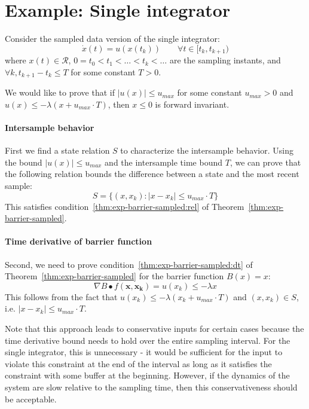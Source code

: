 \documentclass[12pt]{article}
\newcommand{\vecbold}[1]{\boldsymbol{#1}}
\begin{document}
\section{Example: Single integrator}
Consider the sampled data version of the single integrator:
\[\dot{x}(t) = u(x(t_k)) \qquad \forall t \in [t_k, t_{k+1})\]
where $x(t) \in \mathcal{R}$, $0 = t_0 < t_1 < \ldots < t_k < \ldots$ are
the sampling instants, and $\forall k, t_{k+1} - t_k \leq T$ for some
constant $T > 0$.

We would like to prove that if $|u(x)| \leq u_{max}$ for some constant
$u_{max} > 0$ and $u(x) \leq -\lambda(x + u_{max}\cdot T)$, then $x \leq 0$
is forward invariant.

\paragraph{Intersample behavior}
First we find a state relation $S$ to characterize the intersample
behavior. Using the bound $|u(x)| \leq u_{max}$ and the intersample time
bound $T$, we can prove that the following relation bounds the difference
between a state and the most recent sample:
\[S = \{(x,x_k) : |x - x_k| \leq u_{max}\cdot T\}\]
This satisfies condition~\ref{thm:exp-barrier-sampled:rel} of
Theorem~\ref{thm:exp-barrier-sampled}.

\paragraph{Time derivative of barrier function}
Second, we need to prove condition~\ref{thm:exp-barrier-sampled:dt} of
Theorem~\ref{thm:exp-barrier-sampled} for the barrier function $B(x) = x$:
\[\nabla B \bullet f(\vecbold{x},\vecbold{x_k}) = u(x_k) \leq -\lambda x\]
This follows from the fact that $u(x_k) \leq -\lambda(x_k + u_{max}\cdot
T)$ and $(x,x_k) \in S$, i.e. $|x - x_k| \leq u_{max}\cdot T$.

Note that this approach leads to conservative inputs for certain cases
because the time derivative bound needs to hold over the entire sampling
interval. For the single integrator, this is unnecessary - it would be
sufficient for the input to violate this constraint at the end of the
interval as long as it satisfies the constraint with some buffer at the
beginning. However, if the dynamics of the system are slow relative to the
sampling time, then this conservativeness should be acceptable.

\end{document}
